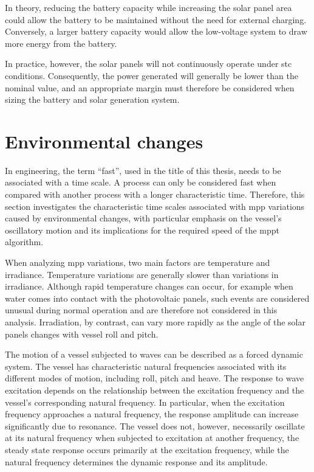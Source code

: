 In theory, reducing the battery capacity while increasing the solar panel area could allow the battery to be maintained without the need for external charging. Conversely, a larger battery capacity would allow the low-voltage system to draw more energy from the battery.

In practice, however, the solar panels will not continuously operate under \ac{stc} conditions. Consequently, the power generated will generally be lower than the nominal value, and an appropriate margin must therefore be considered when sizing the battery and solar generation system.



\section{Environmental changes}

In engineering, the term ``fast'', used in the title of this thesis, needs to be associated with a time scale. A process can only be considered fast when compared with another process with a longer characteristic time. Therefore, this section investigates the characteristic time scales associated with \ac{mpp} variations caused by environmental changes, with particular emphasis on the vessel's oscillatory motion and its implications for the required speed of the \ac{mppt} algorithm.

When analyzing \ac{mpp} variations, two main factors are temperature and irradiance. Temperature variations are generally slower than variations in irradiance. Although rapid temperature changes can occur, for example when water comes into contact with the photovoltaic panels, such events are considered unusual during normal operation and are therefore not considered in this analysis. Irradiation, by contrast, can vary more rapidly as the angle of the solar panels changes with vessel roll and pitch. 

The motion of a vessel subjected to waves can be described as a forced dynamic system. The vessel has characteristic natural frequencies associated with its different modes of motion, including roll, pitch and heave. The response to wave excitation depends on the relationship between the excitation frequency and the vessel's corresponding natural frequency. In particular, when the excitation frequency approaches a natural frequency, the response amplitude can increase significantly due to resonance. The vessel does not, however, necessarily oscillate at its natural frequency when subjected to excitation at another frequency, the steady state response occurs primarily at the excitation frequency, while the natural frequency determines the dynamic response and its amplitude.

